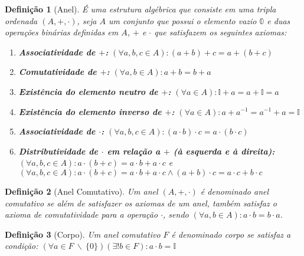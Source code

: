 \documentclass[
    12pt, %
    a4paper, %
]{book}
\newtheorem{defi}{Definição}[section]
\newcommand{\Set}[1]{\mathbb{#1}}
\begin{document}
            \begin{defi}[Anel]\label{defi:anel}
                É uma estrutura algébrica que consiste em uma tripla ordenada $(A,+,\cdot)$, seja $A$ um conjunto que possui o elemento vazio $\Set{0}$ e duas operações binárias definidas em $A$, $+$ e $\cdot$ que satisfazem os seguintes axiomas:

                \begin{enumerate}
                    \item \textbf{Associatividade de $+$:} $(\forall a,b,c \in A): (a+b)+c=a+(b+c)$

                    \item \textbf{Comutatividade de $+$:} $(\forall a,b \in A): a+b=b+a$

                    \item \textbf{Existência do elemento neutro de $+$:} $(\forall a \in A): \Set{I}+a=a+\Set{I}=a$

                    \item \textbf{Existência do elemento inverso de $+$:} $(\forall a \in A): a+a^{-1}=a^{-1}+a=\Set{I}$
                    \item \textbf{Associatividade de $\cdot$:} $(\forall a,b,c \in A): (a\cdot b)\cdot c=a\cdot (b\cdot c)$

                    \item \textbf{Distributividade de $\cdot$ em relação a $+$ (à esquerda e à direita):} $(\forall a,b,c \in A): a\cdot (b+c)=a\cdot b+a\cdot c$ e $(\forall a,b,c \in A): a \cdot (b+c)=a \cdot b+a \cdot c \wedge (a+b)\cdot c=a\cdot c+b\cdot c$
                \end{enumerate}
            \end{defi}

            \begin{defi}[Anel Comutativo]\label{defi:anel-comutativo}
                Um anel $(A,+,\cdot)$ é denominado anel comutativo se além de satisfazer os axiomas de um anel, também satisfaz o axioma de comutatividade para a operação $\cdot$, sendo $(\forall a,b \in A): a\cdot b=b\cdot a$.
            \end{defi}

            \begin{defi}[Corpo]\label{defi:corpo}
                Um anel comutativo $F$ é denominado corpo se satisfaz a condição: $(\forall a \in F\ \backslash\ \{0\})(\exists! b \in F): a\cdot b=\Set{I}$
            \end{defi}
\end{document}
